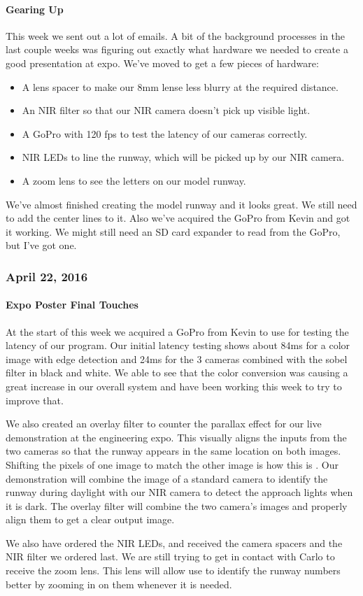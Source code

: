 \paragraph{Gearing Up}
This week we sent out a lot of emails. A bit of the background processes in the last couple weeks was figuring out exactly what hardware we needed to create a good presentation at expo. We've moved to get a few pieces of hardware:

\begin{itemize}[leftmargin=2cm,labelindent=2cm]
\item A lens spacer to make our 8mm lense less blurry at the required distance.
\item An NIR filter so that our NIR camera doesn't pick up visible light.
\item A GoPro with 120 fps to test the latency of our cameras correctly.
\item NIR LEDs to line the runway, which will be picked up by our NIR camera.
\item A zoom lens to see the letters on our model runway.
\end{itemize}

We've almost finished creating the model runway and it looks great. We still need to add the center lines to it. Also we've acquired the GoPro from Kevin and got it working. We might still need an SD card expander to read from the GoPro, but I've got one.\\

\subsubsection{April 22, 2016}
\paragraph{Expo Poster Final Touches}
At the start of this week we acquired a GoPro from Kevin to use for testing the latency of our program. Our initial latency testing shows about 84ms for a color image with edge detection and 24ms for the 3 cameras combined with the sobel filter in black and white. We able to see that the color conversion was causing a great increase in our overall system and have been working this week to try to improve that. 
\par
We also created an overlay filter to counter the parallax effect for our live demonstration at the engineering expo. This visually aligns the inputs from the two cameras so that the runway appears in the same location on both images. Shifting the pixels of one image to match the other image is how this is . Our demonstration will combine the image of a standard camera to identify the runway during daylight with our NIR camera to detect the approach lights when it is dark. The overlay filter will combine the two camera's images and properly align them to get a clear output image.
\par
We also have ordered the NIR LEDs, and received the camera spacers and the NIR filter we ordered last. We are still trying to get in contact with Carlo to receive the zoom lens. This lens will allow use to identify the runway numbers better by zooming in on them whenever it is needed.\\

